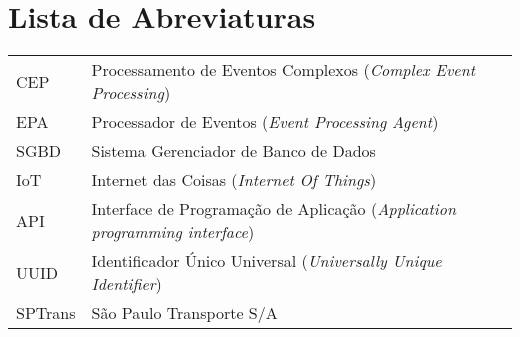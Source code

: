\documentclass[11pt,twoside,a4paper]{book}
\begin{document}
\tableofcontents    %

\chapter{Lista de Abreviaturas}
\begin{tabular}{ll}
         CEP         & Processamento de Eventos Complexos (\emph{Complex Event Processing})\\
         EPA         & Processador de Eventos (\emph{Event Processing Agent})\\
         SGBD        & Sistema Gerenciador de Banco de Dados \\
         IoT         & Internet das Coisas (\emph{Internet Of Things})\\
         API		 & Interface de Programação de Aplicação (\emph{Application programming interface}) \\
         UUID        & Identificador Único Universal (\emph{Universally Unique Identifier}) \\
         SPTrans   & São Paulo Transporte S/A 
\end{tabular}


\listoffigures            
\listoftables            

\mainmatter
\end{document}
